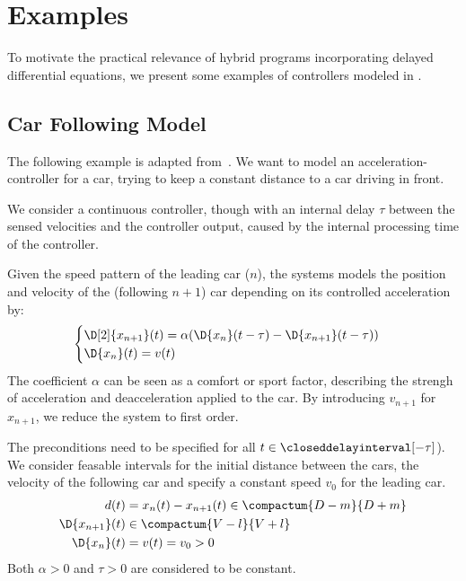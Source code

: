 \chapter{Examples}
\label{ch:example-hp}

To motivate the practical relevance of hybrid programs incorporating delayed differential equations, we present some examples of controllers modeled in \ddL.

\section{Car Following Model}

    The following example is adapted from~\cite{Erneux09AppliedDDEs}.
    We want to model an acceleration-controller for a car, trying to keep a constant distance to a car driving in front.

    We consider a continuous controller, though with an internal delay $\tau$ between the sensed velocities and the controller output, caused by the internal processing time of the controller.

    Given the speed pattern of the leading car ($n$), the systems models the position and velocity of the (following $n+1$) car depending on its controlled acceleration by:
    \begin{equation*}
        \begin{cases}
            \D[2]{x_{n+1}}(t) = \alpha (\D{x_n}(t-\tau)-\D{x_{n+1}}(t-\tau))\\
            \D{x_n}(t) = v(t)
        \end{cases}
    \end{equation*}
    The coefficient $\alpha$ can be seen as a comfort or sport factor, describing the strengh of acceleration and deacceleration applied to the car.
    By introducing $v_{n+1}$ for $x_{n+1}$, we reduce the system to first order.

    The preconditions need to be specified for all $t\in\closeddelayinterval[-\tau]$). We consider feasable intervals for the initial distance between the cars, the velocity of the following car and specify a constant speed $v_0$ for the leading car.
    \begin{align*}
        d(t) &= x_n(t)-x_{n+1}(t) \in\compactum{D-m}{D+m}\\
        \D{x_{n+1}}(t) &\in\compactum{V-l}{V+l}\\
        \D{x_n}(t) &= v(t) = v_0 >0
    \end{align*}
    Both $\alpha>0$ and $\tau>0$ are considered to be constant.

